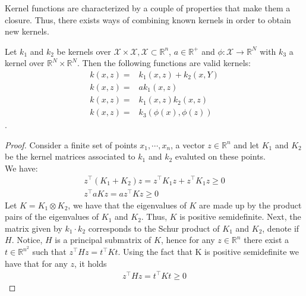 Kernel functions are characterized by a couple of properties that make them a closure. Thus, there exists ways of combining known kernels in order to obtain new kernels.

\begin{proposition}
    Let $k_1$ and $k_2$ be kernels over $\mathcal{X} \times \mathcal{X}, \mathcal{X} \subset \mathbb{R}^n$, $a \in \mathbb{R}^+$ and $\phi: \mathcal{X} \to \mathbb{R}^N$ with $k_3$ a kernel over $\mathbb{R}^N \times \mathbb{R}^N$. Then the following functions are valid kernels:
    \begin{align}
        k(x,z)=&k_1(x,z)+k_2(x,Y)
        \\
        k(x,z)=& ak_1(x,z)
        \\
        k(x,z)=& k_1(x,z)k_2(x,z)
        \\
        k(x,z)=& k_3(\phi(x),\phi(z))
    \end{align}.
\end{proposition}

\begin{proof}
    Consider a finite set of points $x_1, \cdots, x_n$, a vector $z \in \mathbb{R}^n$ and let $K_1$ and $K_2$ be the kernel matrices associated to $k_1$ and $k_2$ evaluted on these points.
    \\
    We have:
    \\
    \begin{align}
    z^\intercal (K_1+K_2) z= z^\intercal K_1 z + z^\intercal K_1 z \geq 0
    \\
    z^\intercal aK z= a z^\intercal K z \geq 0
    \end{align}
    Let $K=K_1 \otimes K_2$, we have that the eigenvalues of $K$ are made up by the product pairs of the eigenvalues of $K_1$ and $K_2$. Thus, $K$ is positive semidefinite. Next, the matrix given by $k_1 \cdot k_2$ corresponds to the Schur product of $K_1$ and $K_2$, denote if $H$. Notice, $H$ is a principal submatrix of $K$, hence for any $z \in \mathbb{R}^n$ there exist a $t \in \mathbb{R}^{n^2}$ such that $z^\intercal H z= t^\intercal K t$. Using the fact that K is positive semidefinite we have that for any $z$, it holds 
    \begin{align}
        z^\intercal H z= t^\intercal K t\geq 0
    \end{align}
\end{proof}

